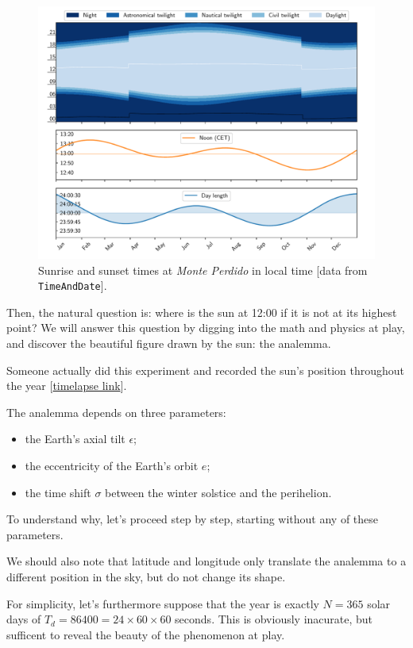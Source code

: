 \documentclass[12pt]{article}
\begin{document}
\begin{figure}[ht]
    \centering
    \includegraphics[width=\textwidth]{./sun_graph.pdf}
    \caption{
        Sunrise and sunset times at \textit{Monte Perdido} in local 
        time [data from \texttt{TimeAndDate}].
    }
    \label{fig:sunrise_sunset}
\end{figure}

Then, the natural question is: where is the sun at 12:00 if it is not at its 
highest point? We will answer this question by digging into the math and physics
at play, and discover the beautiful figure drawn by the sun: the analemma.

Someone actually did this experiment and recorded the sun's position
throughout the year 
[\href{https://www.youtube.com/watch?v=Deli5COMJhs}{timelapse link}].


\newpage
The analemma depends on three parameters:
\begin{itemize}
    \item the Earth's axial tilt $\epsilon$;
    \item the eccentricity of the Earth's orbit $e$;
    \item the time shift $\sigma$ between the winter solstice and the perihelion.
\end{itemize}
To understand why, let's proceed step by step, starting without any of these
parameters.

We should also note that latitude and longitude only translate the analemma
to a different position in the sky, but do not change its shape.

For simplicity, let's furthermore suppose that the year is exactly $N=365$ solar 
days of $T_d = 86400=24\times 60\times 60$ seconds. This is obviously inacurate, 
but sufficent to reveal the beauty of the phenomenon at play.
\end{document}
